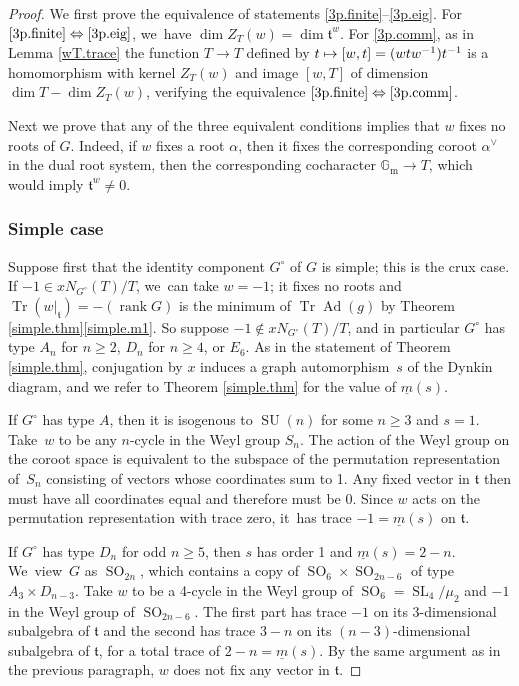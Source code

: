 \documentclass[JEP,XML,SOM,Unicode,NoFloatCountersInSection,published]{cedram}
\newcommand\mto{\mathchoice{\longmapsto}{\mapsto}{\mapsto}{\mapsto}}
\newcommand{\proofsec}[1]{\subsubsection*{#1}}
\theoremstyle{definition}
\let\ic\circ
\newcommand{\mft}{\mathfrak{t}}
\newcommand{\Gm}{\mathbb{G}_{\mathrm{m}}}
\newcommand{\mmin}{\underline{m}}
\DeclareMathOperator{\SL}{SL}
\DeclareMathOperator{\SU}{SU}
\DeclareMathOperator{\SO}{SO}
\DeclareMathOperator{\Tr}{Tr}
\DeclareMathOperator{\Ad}{Ad}
\DeclareMathOperator{\rank}{rank}
\newcommand{\av}{\alpha^\vee}
\begin{document}
\begin{proof}
We first prove the equivalence of statements \eqref{3p.finite}--\eqref{3p.eig}. For $\eqref{3p.finite}\Leftrightarrow\eqref{3p.eig}$, we~have $\dim Z_T(w) = \dim \mft^{w}$. For \eqref{3p.comm}, as in Lemma \ref{wT.trace} the function $T \to T$ defined by $t \mto [w, t] = (w t w^{-1}) t^{-1}$ is a homomorphism with kernel $Z_T(w)$ and image $[w, T]$ of dimension $\dim T - \dim Z_T(w)$, verifying the equivalence $\eqref{3p.finite}\Leftrightarrow\eqref{3p.comm}$.

Next we prove that any of the three equivalent conditions implies that $w$ fixes no roots of $G$. Indeed, if $w$ fixes a root $\alpha$, then it fixes the corresponding coroot $\av$ in the dual root system, then the corresponding cocharacter $\Gm \to T$, which would imply $\mft^{w} \ne 0$.

\proofsec{Simple case}
Suppose first that the identity component $G^\ic$ of $G$ is simple; this is the crux case.
If $-1 \in xN_{G^\ic}(T)/T$, we~can take $w = -1$; it fixes no roots and $\Tr(w\vert_\mft) = -(\rank G)$ is the minimum of $\Tr \Ad(g)$ by Theorem \ref{simple.thm}\eqref{simple.m1}. So suppose $-1 \notin xN_{G^\ic}(T)/T$, and in particular $G^\ic$ has type $A_n$ for $n \ge 2$, $D_n$ for $n \ge 4$, or $E_6$. As in the statement of Theorem \ref{simple.thm}, conjugation by $x$ induces a graph automorphism~$s$ of the Dynkin diagram, and we refer to Theorem \ref{simple.thm} for the value of $\mmin(s)$.

If $G^\ic$ has type $A$, then it is isogenous to $\SU(n)$ for some $n \ge 3$ and $s = 1$. Take~$w$ to be any $n$-cycle
in the Weyl group $S_n$. The action of the Weyl group on the coroot space is equivalent to the subspace of the permutation representation of~$S_n$ consisting of vectors whose coordinates sum to 1. Any fixed vector in $\mft$ then must have all coordinates equal and therefore must be 0. Since $w$ acts on the permutation representation with trace zero, it~has trace $-1 = \mmin(s)$ on $\mft$.

If $G^\ic$ has type $D_n$ for odd $n \ge 5$, then $s$ has order 1 and $\mmin(s) = 2 - n$. We~view~$G$ as $\SO_{2n}$, which contains a copy of $\SO_6 \times \SO_{2n-6}$ of type $A_3 \times D_{n-3}$. Take $w$ to be a 4-cycle in the Weyl group of $\SO_6 = \SL_4/\mu_2$ and $-1$ in the Weyl group of $\SO_{2n-6}$.
The first part has trace $-1$ on its 3-dimensional subalgebra of $\mft$ and the second has trace $3-n$ on its $(n-3)$-dimensional subalgebra of $\mft$,
for a total trace of $2 - n = \mmin(s)$. By the same argument as in the previous paragraph, $w$ does not fix any vector in $\mft$.


\end{proof}
\end{document}
